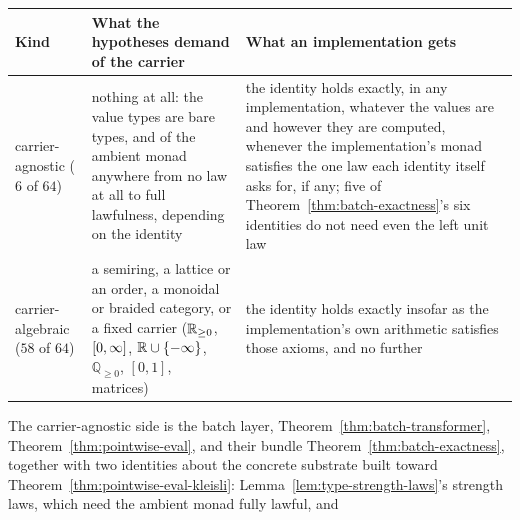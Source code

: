 \begin{center}
\begin{tabular}{p{}p{}p{}}
\hline
{\raggedright\textbf{Kind}\par} &
  {\raggedright\textbf{What the hypotheses demand of the carrier}\par} &
  {\raggedright\textbf{What an implementation gets}\par} \\
\hline
{\raggedright carrier-agnostic ($6$ of $64$)\par} &
  {\raggedright nothing at all: the value types are bare types, and of
   the ambient monad anywhere from no law at all to full lawfulness,
   depending on the identity\par} &
  {\raggedright the identity holds exactly, in any implementation,
   whatever the values are and however they are computed, whenever the
   implementation's monad satisfies the one law each identity itself
   asks for, if any; five of Theorem~\ref{thm:batch-exactness}'s six
   identities do not need even the left unit law\par} \\
{\raggedright carrier-algebraic ($58$ of $64$)\par} &
  {\raggedright a semiring, a lattice or an order, a monoidal or
   braided category, or a fixed carrier ($\mathbb R_{\ge 0}$, $[0,\infty]$,
   $\mathbb R \cup \{-\infty\}$, $\mathbb Q_{\ge 0}$, $[0,1]$, matrices)\par} &
  {\raggedright the identity holds exactly insofar as the
   implementation's own arithmetic satisfies those axioms, and no
   further\par} \\
\hline
\end{tabular}
\end{center}
The carrier-agnostic side is the batch layer,
Theorem~\ref{thm:batch-transformer},
Theorem~\ref{thm:pointwise-eval}, and their bundle
Theorem~\ref{thm:batch-exactness}, together with two identities about
the concrete substrate built toward
Theorem~\ref{thm:pointwise-eval-kleisli}: Lemma~\ref{lem:type-strength-laws}'s
strength laws, which need the ambient monad fully lawful, and
